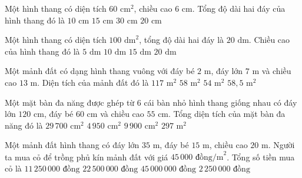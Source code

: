 \begin{ex} %
Một hình thang có diện tích $60\text{ cm}^2$, chiều cao $6\text{ cm}$. Tổng độ dài hai đáy của hình thang đó là
\choice
{$10\text{ cm}$}
{$15\text{ cm}$}
{$30\text{ cm}$}
{\True $20\text{ cm}$}
\end{ex}

\begin{ex} %
Một hình thang có diện tích $100\text{ dm}^2$, tổng độ dài hai đáy là $20\text{ dm}$. Chiều cao của hình thang đó là
\choice
{$5\text{ dm}$}
{\True $10\text{ dm}$}
{$15\text{ dm}$}
{$20\text{ dm}$}
\end{ex}

\begin{ex} %
Một mảnh đất có dạng hình thang vuông với đáy bé $2\text{ m}$, đáy lớn $7\text{ m}$ và chiều cao $13\text{ m}$. Diện tích của mảnh đất đó là
\choice
{$117\text{ m}^2$}
{$58\text{ m}^2$}
{$54\text{ m}^2$}
{\True $58{,}5\text{ m}^2$}
\end{ex}

\begin{ex} %
Một mặt bàn đa năng được ghép từ $6$ cái bàn nhỏ hình thang giống nhau có đáy lớn $120\text{ cm}$, đáy bé $60\text{ cm}$ và chiều cao $55\text{ cm}$. Tổng diện tích của mặt bàn đa năng đó là
\choice
{\True $29\,700\text{ cm}^2$}
{$4\,950\text{ cm}^2$}
{$9\,900\text{ cm}^2$}
{$297\text{ m}^2$}
\end{ex}

\begin{ex} %
Một mảnh đất hình thang có đáy lớn $35\text{ m}$, đáy bé $15\text{ m}$, chiều cao $20\text{ m}$. Người ta mua cỏ để trồng phủ kín mảnh đất với giá $45\,000\text{ đồng/m}^2$. Tổng số tiền mua cỏ là
\choice
{$11\,250\,000\text{ đồng}$}
{\True $22\,500\,000\text{ đồng}$}
{$45\,000\,000\text{ đồng}$}
{$2\,250\,000\text{ đồng}$}
\end{ex}

